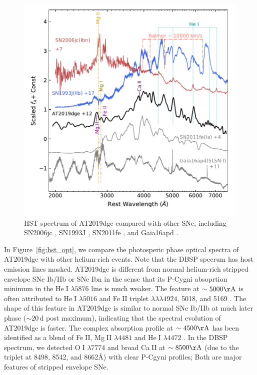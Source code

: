 \documentclass[twocolumn]{aastex63}
\def\ion#1#2{#1$\;${\footnotesize\rm{#2}}\relax}
\begin{document}
\begin{CJK*}{UTF8}{gbsn}
\begin{figure}[htbp!]
	\centering
	\includegraphics[width=\columnwidth]{figures/hst_all.pdf}
	\caption{HST spectrum of AT2019dge compared with other SNe, including SN2006jc 
		\citep{Bufano2009}, SN1993J \citep{Jeffery1994}, SN2011fe \citep{Mazzali2014}, and Gaia16apd 
		\citep{Yan2017}.
		\label{fig:hst}}
\end{figure}

In Figure~\ref{fig:hst_opt}, we compare the photosperic phase optical spectra of 
AT2019dge with other helium-rich events. Note that the DBSP specrum has host emission lines 
masked. AT2019dge is different from normal helium-rich stripped envelope SNe Ib/IIb or SNe Ibn in the 
sense that its P-Cygni absoprtion minimum in the \ion{He}{I} $\lambda5876$ line is much weaker. The 
feature at $\sim5000{\rm \AA}$ is often attributed to \ion{He}{I} $\lambda 5016$ and \ion{Fe}{II} triplet 
$\lambda\lambda\lambda4924$, 5018, and 5169 \citep{Liu2016}. The shape of this feature in 
AT2019dge is similar to normal SNe Ib/IIb at much later phase ($\sim 20$\,d post maximum), indicating 
that the spectral evolution of AT2019dge is faster. The complex absorption 
profile at $\sim4500{\rm \AA}$ has been identified as a blend of \ion{Fe}{II}, \ion{Mg}{II} $\lambda 4481$ 
and \ion{He}{I} $\lambda 4472$ \citep{Hamuy2002}. In the DBSP spectrum, we detected \ion{O}{I} 
$\lambda 7774$ and broad \ion{Ca}{II} at $\sim8500{\rm \AA}$ (due to the triplet at 8498, 8542, and 
8662\AA) with clear P-Cgyni profiles; Both are major features of stripped envelope SNe. 


\end{CJK*}
\end{document}

